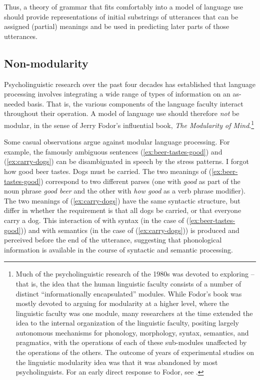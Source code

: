 \documentclass[output=paper,biblatex,babelshorthands,newtxmath,draftmode,colorlinks,citecolor=brown]{langscibook}
\begin{document}
Thus, a theory of grammar that fits comfortably into a model of language use should provide
representations of initial substrings of utterances that can be assigned (partial) meanings and be
used in predicting later parts of those utterances. 

\subsection{Non-modularity}

\largerpage
Psycholinguistic research over the past four decades has established that language processing
involves integrating a wide range of types of information on an as-needed basis.  That is, the
various components of the language faculty interact throughout their operation.  A model of language
use should therefore \emph{not} be modular, in the sense of Jerry Fodor's influential
\citeyear{Fodor83a-u} book, \emph{The Modularity of Mind}.\footnote{Much of the psycholinguistic
  research of the 1980s was devoted to exploring  -- that is, the idea that the
  human linguistic faculty consists of a number of distinct ``informationally encapsulated''
  modules.  While Fodor's book was mostly devoted to arguing for modularity at a higher level, where
  the linguistic faculty was one module, many researchers at the time extended the idea to the
  internal organization of the linguistic faculty, positing largely autonomous mechanisms for
  phonology, morphology, syntax, semantics, and pragmatics, with the operations of each of these
  sub-modules unaffected by the operations of the others. The outcome of years of experimental
  studies on the linguistic modularity idea was that it was abandoned by most psycholinguists. For
  an early direct response to Fodor, see \citet{MarslenTyler87}.}

Some casual observations argue against modular language processing.  For example, the famously
ambiguous sentences (\ref{ex:beer-tastes-good}) and (\ref{ex:carry-dogs}) can be disambiguated in
speech by the stress patterns.
\eal
\ex I forgot how good beer tastes.\label{ex:beer-tastes-good}
\ex Dogs must be carried.\label{ex:carry-dogs}
\zl
The two meanings of (\ref{ex:beer-tastes-good}) correspond to two different parses (one with \emph{good} as part of the noun phrase \emph{good beer} and the other with \emph{how good} as a verb phrase modifier).  The two meanings of (\ref{ex:carry-dogs}) have the same syntactic structure, but differ in whether the requirement is that all dogs be carried, or that everyone carry a dog.  This interaction of  with syntax (in the case of (\ref{ex:beer-tastes-good})) and with semantics (in the case of (\ref{ex:carry-dogs})) is produced and perceived before the end of the utterance, suggesting that phonological information is available in the course of syntactic and semantic processing.  
\end{document}
